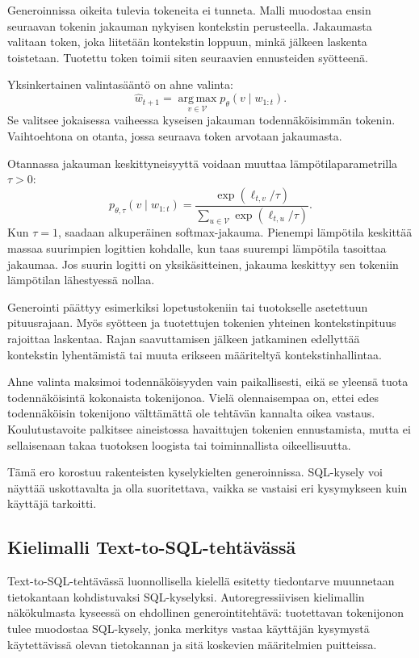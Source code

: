Generoinnissa oikeita tulevia tokeneita ei tunneta.
Malli muodostaa ensin seuraavan tokenin jakauman nykyisen
kontekstin perusteella. Jakaumasta valitaan token, joka
liitetään kontekstin loppuun, minkä jälkeen laskenta
toistetaan. Tuotettu token toimii siten seuraavien
ennusteiden syötteenä.

Yksinkertainen valintasääntö on ahne valinta:
$$
\widehat{w}_{t+1}
=
\operatorname*{arg\,max}_{v \in \mathcal{V}}
p_{\theta}(v \mid w_{1:t}).
$$
Se valitsee jokaisessa vaiheessa kyseisen jakauman
todennäköisimmän tokenin. Vaihtoehtona on otanta,
jossa seuraava token arvotaan jakaumasta.

Otannassa jakauman keskittyneisyyttä voidaan muuttaa
lämpötilaparametrilla \(\tau>0\):
$$
p_{\theta,\tau}(v \mid w_{1:t})
=
\frac{\exp(\ell_{t,v}/\tau)}
{\displaystyle\sum_{u \in \mathcal{V}}
\exp(\ell_{t,u}/\tau)}.
$$
Kun \(\tau=1\), saadaan alkuperäinen softmax-jakauma.
Pienempi lämpötila keskittää massaa suurimpien logittien
kohdalle, kun taas suurempi lämpötila tasoittaa jakaumaa.
Jos suurin logitti on yksikäsitteinen, jakauma keskittyy
sen tokeniin lämpötilan lähestyessä nollaa.

Generointi päättyy esimerkiksi lopetustokeniin tai
tuotokselle asetettuun pituusrajaan. Myös syötteen ja
tuotettujen tokenien yhteinen kontekstinpituus rajoittaa
laskentaa. Rajan saavuttamisen jälkeen jatkaminen edellyttää
kontekstin lyhentämistä tai muuta erikseen määriteltyä
kontekstinhallintaa.

Ahne valinta maksimoi todennäköisyyden vain paikallisesti,
eikä se yleensä tuota todennäköisintä kokonaista
tokenijonoa. Vielä olennaisempaa on, ettei edes
todennäköisin tokenijono välttämättä ole tehtävän
kannalta oikea vastaus. Koulutustavoite palkitsee
aineistossa havaittujen tokenien ennustamista,
mutta ei sellaisenaan takaa tuotoksen loogista
tai toiminnallista oikeellisuutta.

Tämä ero korostuu rakenteisten kyselykielten
generoinnissa. SQL-kysely voi näyttää uskottavalta
ja olla suoritettava, vaikka se vastaisi eri
kysymykseen kuin käyttäjä tarkoitti.

\subsection{Kielimalli Text-to-SQL-tehtävässä}

Text-to-SQL-tehtävässä luonnollisella kielellä esitetty
tiedontarve muunnetaan tietokantaan kohdistuvaksi
SQL-kyselyksi. Autoregressiivisen kielimallin näkökulmasta
kyseessä on ehdollinen generointitehtävä: tuotettavan
tokenijonon tulee muodostaa SQL-kysely, jonka merkitys
vastaa käyttäjän kysymystä käytettävissä olevan tietokannan
ja sitä koskevien määritelmien puitteissa.

